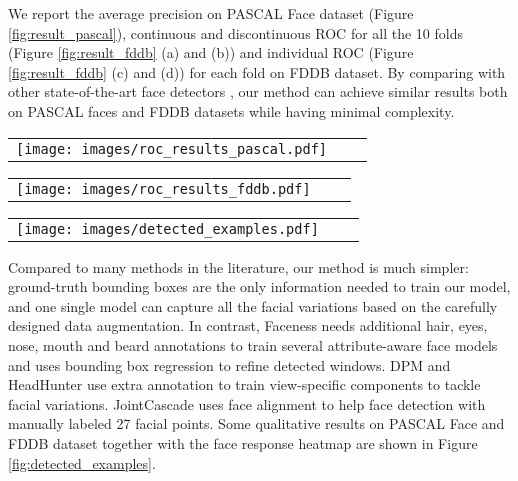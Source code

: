 \documentclass[10pt,twocolumn,letterpaper]{article}
\begin{document}
We report the average precision on PASCAL Face dataset (Figure \ref{fig:result_pascal}), continuous and discontinuous ROC for all the 10 folds (Figure \ref{fig:result_fddb} (a) and (b)) and individual ROC (Figure \ref{fig:result_fddb} (c) and (d)) for each fold on FDDB dataset. By comparing with other state-of-the-art face detectors \cite{farfade2015multi, li2015convolutional, markuvs2013method, chen2014joint, li2014efficient, li2013learning, kostinger2012robust, jain2011online, subburaman2010fast}, our method can achieve similar results both on PASCAL faces \cite{yan2014face} and FDDB \cite{fddbTech} datasets while having minimal complexity. 

\begin{figure*}[!htb]
\begin{tabular}{ccc}
\rule{0pt}{1ex}\hspace{2.24mm}\texttt{[image: images/roc\_results\_pascal.pdf]}\\[-0.1pt]
\end{tabular}
\caption{Performance comparison on PASCAL Face dataset}
\label{fig:result_pascal}
\end{figure*}



\begin{figure*}
\begin{tabular}{ccc}
\rule{0pt}{1ex}\hspace{2.24mm}\texttt{[image: images/roc\_results\_fddb.pdf]}\\[-0.1pt]
\end{tabular}
\caption{Performance comparison on FDDB dataset with discrete and continuous protocols.}
\label{fig:result_fddb}
\end{figure*}


\begin{figure*}
\begin{tabular}{ccc}
\rule{0pt}{1ex}\hspace{2.24mm}\texttt{[image: images/detected\_examples.pdf]}\\[-0.1pt]
\end{tabular}
\caption{Qualitative face detection results and face response heatmap by our detector on PASCAL face (top two rows) and FDDB dataset (bottom two rows).}
\label{fig:detected_examples}
\end{figure*}

Compared to many methods in the literature, our method is much simpler: ground-truth bounding boxes are the only information needed to train our model, and one single model can capture all the facial variations based on the carefully designed data augmentation. In contrast, Faceness \cite{yang2015facial} needs additional hair, eyes, nose, mouth and beard annotations to train several attribute-aware face models and uses bounding box regression to refine detected windows. DPM and HeadHunter \cite{mathias2014face} use extra annotation to train view-specific components to tackle facial variations. JointCascade \cite{chen2014joint} uses face alignment to help face detection with manually labeled 27 facial points. Some qualitative results on PASCAL Face and FDDB dataset together with the face response heatmap are shown in Figure \ref{fig:detected_examples}.
\end{document}
